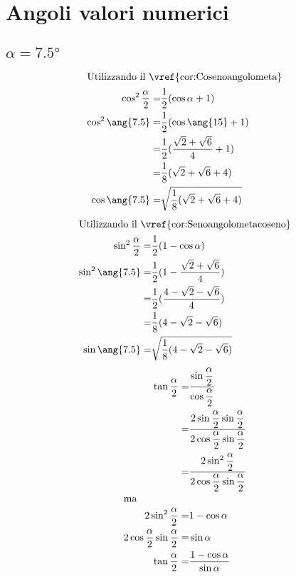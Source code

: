 \chapter{Angoli valori numerici}\label{chap:Angoli_valori_numerici}
\section{$\alpha=\ang{7.5}$}
\begin{align*}
	\intertext{Utilizzando il~\vref{cor:Cosenoangolometa}}
	\cos^2\dfrac{\alpha}{2}=&\dfrac{1}{2}(\cos\alpha+1)\\
	\cos^2\ang{7.5}=&\dfrac{1}{2}(\cos\ang{15}+1)\\ 
	=&\dfrac{1}{2}(\dfrac{\sqrt{2}+\sqrt{6}}{4}+1)\\
	=&\dfrac{1}{8}(\sqrt{2}+\sqrt{6}+4)\\
	\cos\ang{7.5}=&\sqrt{\dfrac{1}{8}(\sqrt{2}+\sqrt{6}+4)}\\
\end{align*}
\begin{align*}
\intertext{Utilizzando il~\vref{cor:Senoangolometacoseno}}
\sin^2\dfrac{\alpha}{2}=&\dfrac{1}{2}(1-\cos\alpha)\\ 
\sin^2\ang{7.5}=&\dfrac{1}{2}(1-\dfrac{\sqrt{2}+\sqrt{6}}{4})\\ 
=&\dfrac{1}{2}(\dfrac{4-\sqrt{2}-\sqrt{6}}{4})\\ 
=&\dfrac{1}{8}(4-\sqrt{2}-\sqrt{6})\\ 
\sin\ang{7.5}=&\sqrt{\dfrac{1}{8}(4-\sqrt{2}-\sqrt{6})}
\end{align*}
\begin{align*}
	\tan\dfrac{\alpha}{2}=&\dfrac{\sin\dfrac{\alpha}{2}}{\cos\dfrac{\alpha}{2}}\\
	=&\dfrac{2\sin\dfrac{\alpha}{2}\sin\dfrac{\alpha}{2}}{2\cos\dfrac{\alpha}{2}\sin\dfrac{\alpha}{2}}\\
	=&\dfrac{2\sin^2\dfrac{\alpha}{2}}{2\cos\dfrac{\alpha}{2}\sin\dfrac{\alpha}{2}}\\
	\intertext{ma}
	2\sin^2\dfrac{\alpha}{2}=&1-\cos\alpha\\
	2\cos\dfrac{\alpha}{2}\sin\dfrac{\alpha}{2}=&\sin\alpha\\
	\tan\dfrac{\alpha}{2}=&\dfrac{1-\cos\alpha}{\sin\alpha}\\
\end{align*}
